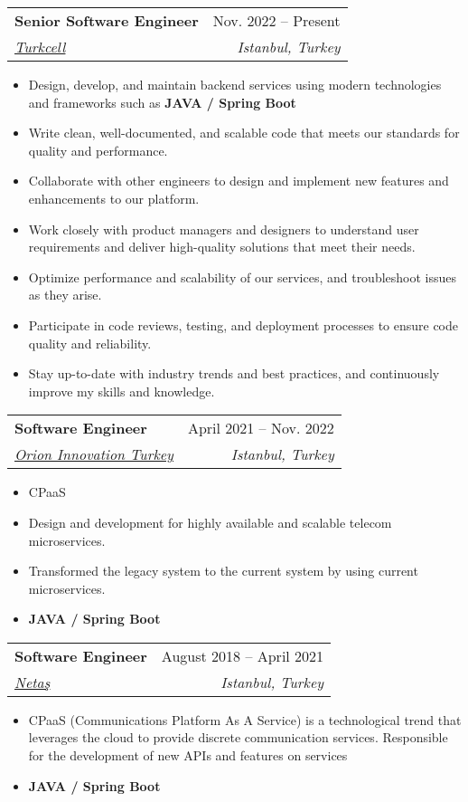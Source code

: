 \documentclass[letterpaper,11pt]{article}
\makeatletter
\newcommand{\resumeItem}[1]{
  \item\small{
    {#1 \vspace{-2pt}}
  }
}
\newcommand{\resumeSubheading}[4]{
  \vspace{-2pt}\item
    \begin{tabular*}{0.97\textwidth}[t]{l@{\extracolsep{\fill}}r}
      \textbf{#1} & #2 \\
      \textit{\small#3} & \textit{\small #4} \\
    \end{tabular*}\vspace{-7pt}
}
\newcommand{\resumeSubSubheading}[2]{
    \item
    \begin{tabular*}{0.97\textwidth}{l@{\extracolsep{\fill}}r}
      \textit{\small#1} & \textit{\small #2} \\
    \end{tabular*}\vspace{-7pt}
}
\newcommand{\resumeSubHeadingListEnd}{\end{itemize}}
\newcommand{\resumeItemListStart}{\begin{itemize}}
\newcommand{\resumeItemListEnd}{\end{itemize}\vspace{-5pt}}
\makeatother
\begin{document}
    \resumeSubheading
      {Senior Software Engineer}{Nov. 2022 -- Present}
      {\href{https://www.turkcell.com.tr/}{\underline{Turkcell}}}{Istanbul, Turkey}
      \resumeItemListStart
        \resumeItem{Design, develop, and maintain backend services using modern technologies and frameworks such as \textbf{JAVA / Spring Boot } }
        \resumeItem{Write clean, well-documented, and scalable code that meets our standards for quality and performance.}
        \resumeItem{Collaborate with other engineers to design and implement new features and enhancements to our platform.}
        \resumeItem{Work closely with product managers and designers to understand user requirements and deliver high-quality solutions that meet their needs.}
        \resumeItem{Optimize performance and scalability of our services, and troubleshoot issues as they arise.}
        \resumeItem{Participate in code reviews, testing, and deployment processes to ensure code quality and reliability. }
        \resumeItem{Stay up-to-date with industry trends and best practices, and continuously improve my skills and knowledge.}
      \resumeItemListEnd
      

    \resumeSubheading
      {Software Engineer}{April 2021 -- Nov. 2022}
      {\href{https://www.linkedin.com/company/orion-innovation-turkey/}{\underline{Orion Innovation Turkey}}}{Istanbul, Turkey}
      \resumeItemListStart
        \resumeItem{ CPaaS }
        \resumeItem{ Design and development for highly available and scalable telecom microservices.}
        \resumeItem{Transformed the legacy system to the current system by using current microservices.}
        \resumeItem{ \textbf{JAVA / Spring Boot }}
    \resumeItemListEnd

    \resumeSubheading
      {Software Engineer}{August 2018 -- April 2021}
      {\href{https://netas.com.tr/}{\underline{Netaş}}}{Istanbul, Turkey}
      \resumeItemListStart
        \resumeItem{ CPaaS (Communications Platform As A Service) is a technological trend that leverages the cloud to provide discrete communication services. Responsible for the development of new APIs and features on services}
        \resumeItem{\textbf{JAVA / Spring Boot }}
      \resumeItemListEnd
\end{document}
